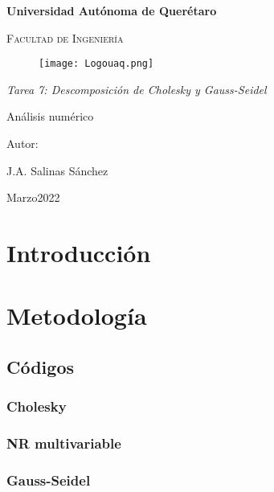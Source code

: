 \documentclass[12pt,oneside,FLEQN]{report}
\begin{document}
{
\selectfont
\begin{titlepage}
        \topmargin=0cm
        \centering

        {\bfseries\LARGE Universidad Autónoma de Querétaro \par}
        \vspace{1cm}
        {\scshape\Large  Facultad de Ingenier\'ia  \par}
        \vspace{2cm}
        \centering
        \begin{figure}[!h]
        \centering
                \texttt{[image: Logouaq.png]}
        \end{figure}
        \vspace{3cm}
        {\itshape\large Tarea 7: Descomposición de Cholesky y Gauss-Seidel\par}
        \vspace{3cm}
        {\Huge Análisis numérico \par}
        \vspace{2cm}
        {\Large Autor: \par}
        {\large J.A. Salinas Sánchez \par}
        {\large Marzo2022 \par}
\end{titlepage}
\tableofcontents
\chapter{Introducción}
\chapter{Metodología}
	\section{Códigos}
		\subsection{Cholesky}
			
		\subsection{NR multivariable}
			
		\subsection{Gauss-Seidel}
			
}
\end{document}
